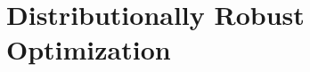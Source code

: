\documentclass[10pt,a4paper]{amsart}
\numberwithin{equation}{section}
\numberwithin{theorem}{section}
\numberwithin{table}{section}
\numberwithin{figure}{section}
\begin{document}



\section{Distributionally Robust Optimization}
\label{sec:DRO}
\end{document}
